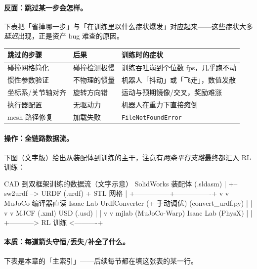 \paragraph{反面：跳过某一步会怎样。}下表把「省掉哪一步」与「在训练里以什么症状爆发」对应起来——这些症状大多\emph{延迟}出现，正是资产 bug 难查的原因。

\begin{center}
\small
\begin{tabular}{@{}lll@{}}
\toprule
跳过的步骤 & 后果 & 训练时的症状 \\
\midrule
碰撞网格简化 & 碰撞检测极慢 & 训练吞吐崩到个位数 fps，几乎跑不动 \\
惯性参数验证 & 不物理的惯量 & 机器人「抖动」或「飞走」，数值发散 \\
坐标系/关节轴对齐 & 旋转方向错 & 运动与预期镜像/交叉，奖励难涨 \\
执行器配置 & 无驱动力 & 机器人在重力下直接瘫倒 \\
mesh 路径修复 & 加载失败 & \texttt{FileNotFoundError} \\
\bottomrule
\end{tabular}
\end{center}

\paragraph{操作：全链路数据流。}下图（文字版）给出从装配体到训练的主干，注意有\emph{两条平行支路}最终都汇入 RL 训练：

\begin{codebox}{CAD 到双框架训练的数据流（文字示意）}
SolidWorks 装配体 (.sldasm)
    |
    +-- sw2urdf --> URDF (.urdf) + STL 网格
                        |
        +---------------+----------------+
        v                                v
   MuJoCo 编译器直读                 Isaac Lab UrdfConverter
   (+ 手动调优)                      (convert_urdf.py)
        |                                |
        v                                v
   MJCF (.xml)                      USD (.usd)
        |                                |
        v                                v
   mjlab (MuJoCo-Warp)             Isaac Lab (PhysX)
        |                                |
        +-----------> RL 训练 <----------+
\end{codebox}

\paragraph{本质：每道箭头守恒/丢失/补全了什么。}下表是本章的「主索引」——后续每节都在填这张表的某一行。

